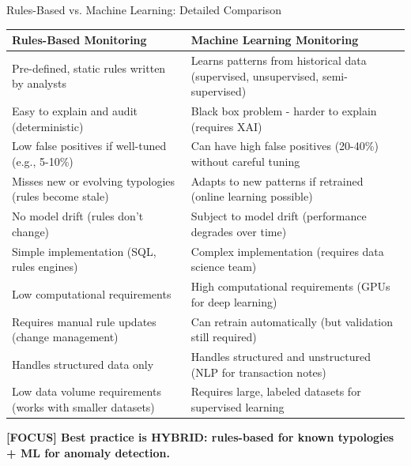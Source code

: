 \documentclass[11pt,a4paper]{beamer}
\newcommand{\examfocus}[1]{\textcolor{orange!80!black}{\textbf{[FOCUS] #1}}}
\begin{document}
\begin{frame}{Rules-Based vs. Machine Learning: Detailed Comparison}
	\begin{longtable}{p{}|p{}}
		\hline
		\rowcolor{lightgray}
		\textbf{Rules-Based Monitoring} & \textbf{Machine Learning Monitoring} \\
		\hline
		Pre-defined, static rules written by analysts & Learns patterns from historical data (supervised, unsupervised, semi-supervised) \\
		\hline
		Easy to explain and audit (deterministic) & Black box problem - harder to explain (requires XAI) \\
		\hline
		Low false positives if well-tuned (e.g., 5-10\%) & Can have high false positives (20-40\%) without careful tuning \\
		\hline
		Misses new or evolving typologies (rules become stale) & Adapts to new patterns if retrained (online learning possible) \\
		\hline
		No model drift (rules don't change) & Subject to model drift (performance degrades over time) \\
		\hline
		Simple implementation (SQL, rules engines) & Complex implementation (requires data science team) \\
		\hline
		Low computational requirements & High computational requirements (GPUs for deep learning) \\
		\hline
		Requires manual rule updates (change management) & Can retrain automatically (but validation still required) \\
		\hline
		Handles structured data only & Handles structured and unstructured (NLP for transaction notes) \\
		\hline
		Low data volume requirements (works with smaller datasets) & Requires large, labeled datasets for supervised learning \\
		\hline
	\end{longtable}
	\examfocus{Best practice is HYBRID: rules-based for known typologies + ML for anomaly detection.}
\end{frame}
\end{document}
